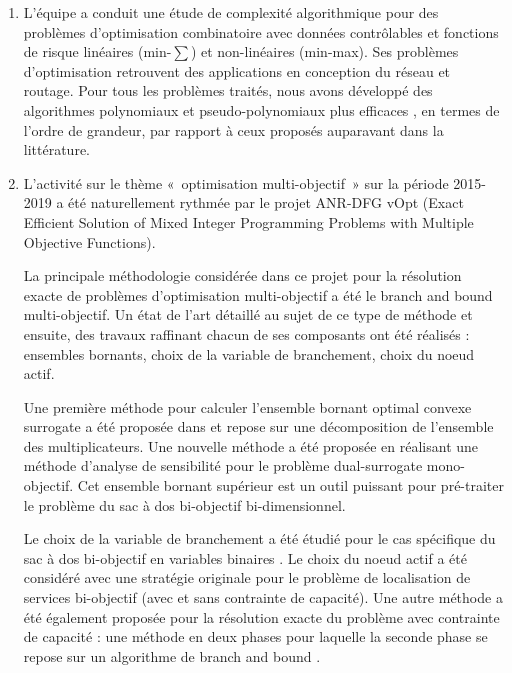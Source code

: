 \begin{enumerate}
    \item L’équipe a conduit une étude de complexité algorithmique pour des problèmes d'optimisation combinatoire avec données contrôlables et fonctions de risque linéaires (min-$\sum$) et non-linéaires (min-max). Ses problèmes d’optimisation retrouvent des applications en conception du réseau et routage. Pour tous les problèmes traités, nous avons développé des algorithmes polynomiaux et pseudo-polynomiaux plus efficaces \cite{Gurevsky2015,Gurevsky2016a,Gurevsky2016b,Gurevsky2020}, en termes de l'ordre de grandeur, par rapport à ceux proposés auparavant dans la littérature. 
    
    \item L’activité sur le thème « optimisation multi-objectif » sur la période 2015-2019 a été naturellement rythmée par le projet ANR-DFG vOpt (Exact Efficient Solution of Mixed Integer Programming Problems with Multiple Objective Functions).


La principale méthodologie considérée dans ce projet pour la résolution exacte de problèmes d’optimisation multi-objectif a été le branch and bound multi-objectif. Un état de l’art détaillé au sujet de ce type de méthode \cite{przybylski:hal-01717951} et ensuite, des travaux raffinant chacun de ses composants ont été réalisés : ensembles bornants, choix de la variable de branchement, choix du noeud actif. 


Une première méthode pour calculer l’ensemble bornant optimal convexe surrogate a été proposée dans \cite{cerqueus:hal-01158355} et repose sur une décomposition de l’ensemble des multiplicateurs. Une nouvelle méthode \cite{przybylski:hal-02480174} a été proposée en réalisant une méthode d’analyse de sensibilité pour le problème dual-surrogate mono-objectif. Cet ensemble bornant supérieur est un outil puissant pour pré-traiter le problème du sac à dos bi-objectif bi-dimensionnel.

Le choix de la variable de branchement a été étudié pour le cas spécifique du sac à dos bi-objectif en variables binaires \cite{cerqueus:hal-01564982}. Le choix du noeud actif a été considéré avec une stratégie originale pour le problème de localisation de services bi-objectif \cite{delmee:hal-01435524} (avec et sans contrainte de capacité). Une autre méthode a  été également proposée pour la résolution exacte du problème avec contrainte de capacité : une méthode en deux phases pour laquelle la seconde phase se repose sur un algorithme de branch and bound \cite{delmee:hal-02480176}. 
\end{enumerate}
